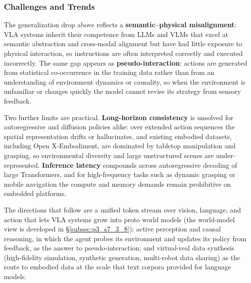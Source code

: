 \subsubsection{Challenges and Trends}
The generalization drop above reflects a \textbf{semantic--physical misalignment}: VLA systems inherit their competence from LLMs and VLMs that excel at semantic abstraction and cross-modal alignment but have had little exposure to physical interaction, so instructions are often interpreted correctly and executed incorrectly.
The same gap appears as \textbf{pseudo-interaction}: actions are generated from statistical co-occurrence in the training data rather than from an understanding of environment dynamics or causality, so when the environment is unfamiliar or changes quickly the model cannot revise its strategy from sensory feedback.

Two further limits are practical.
\textbf{Long-horizon consistency} is unsolved for autoregressive and diffusion policies alike: over extended action sequences the spatial representation drifts or hallucinates, and existing embodied datasets, including Open X-Embodiment, are dominated by tabletop manipulation and grasping, so environmental diversity and large unstructured scenes are under-represented.
\textbf{Inference latency} compounds across autoregressive decoding of large Transformers, and for high-frequency tasks such as dynamic grasping or mobile navigation the compute and memory demands remain prohibitive on embedded platforms.

The directions that follow are a unified token stream over vision, language, and action that lets VLA systems grow into proto world models (the world-model view is developed in §\ref{subsec:p3_s7_3_8}); active perception and causal reasoning, in which the agent probes its environment and updates its policy from feedback, as the answer to pseudo-interaction; and virtual-real data synthesis (high-fidelity simulation, synthetic generation, multi-robot data sharing) as the route to embodied data at the scale that text corpora provided for language models.
